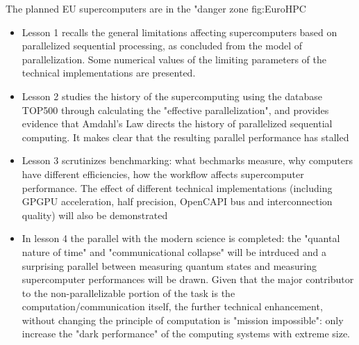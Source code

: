 {
{The planned EU supercomputers are in the "danger zone}
{fig:EuroHPC}{}
{}
}

{
	\begin{itemize}
		\item Lesson 1 recalls the general limitations affecting
		supercomputers based on parallelized sequential processing, 
		as concluded from the model of parallelization.
		Some numerical values of the limiting parameters of the technical implementations are presented.
		\item Lesson 2 studies the history of the supercomputing using
		the database TOP500 through calculating the "effective parallelization", and provides evidence that Amdahl's Law directs
		the history of parallelized sequential computing. It makes clear that the resulting parallel performance has stalled
		\item Lesson 3 scrutinizes benchmarking: what bechmarks measure, 
		why computers have different efficiencies, how the workflow 
		affects supercomputer performance. The effect of different technical implementations
		(including GPGPU acceleration, half precision, OpenCAPI bus and interconnection quality) will also be demonstrated
		\item In lesson 4 the parallel with the modern science is completed:
		the "quantal nature of time" and "communicational collapse" 
		will be intrduced and a surprising parallel between measuring
		quantum states and measuring supercomputer performances
		will be drawn. Given that the
		major contributor to the non-parallelizable portion of the task
		is the computation/communication itself, the further technical enhancement, without changing the principle of computation is "mission impossible": only increase the "dark performance" of the computing systems with extreme size.		
		
	\end{itemize}
}

